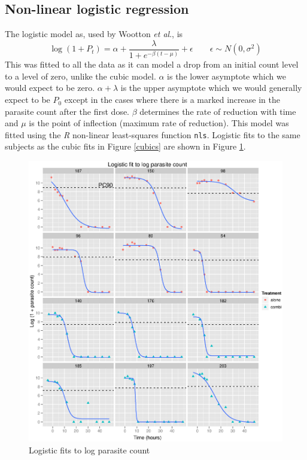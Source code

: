 \subsection{Non-linear logistic regression}
The logistic model as, used by Wootton \textit{et al}.\cite{wootton}, is
$$\log(1+P_t)=\alpha+\frac{\lambda}{1+e^{-\beta(t-\mu)}}+\epsilon\quad\quad\epsilon\sim N(0,\sigma^2)$$
This was fitted to all the data as it can model a drop from an initial count level to a level of zero, unlike the cubic model. $\alpha$ is the lower asymptote which we would expect to be zero. $\alpha+\lambda$ is the upper asymptote which we would generally expect to be $P_0$ except in the cases where there is a marked increase in the parasite count after the first dose. $\beta$ determines the rate of reduction with time and $\mu$ is the point of inflection (maximum rate of reduction). This model was fitted using the \emph{R} non-linear least-squares function \texttt{nls}\cite{R}. Logistic fits to the same subjects as the cubic fits in Figure \ref{cubics} are shown in Figure \ref{logistics}.
\begin{figure}[p]
\includegraphics[width=150mm]{logistics.eps} 
\caption{Logistic fits to log parasite count}\label{logistics}
\end{figure}

